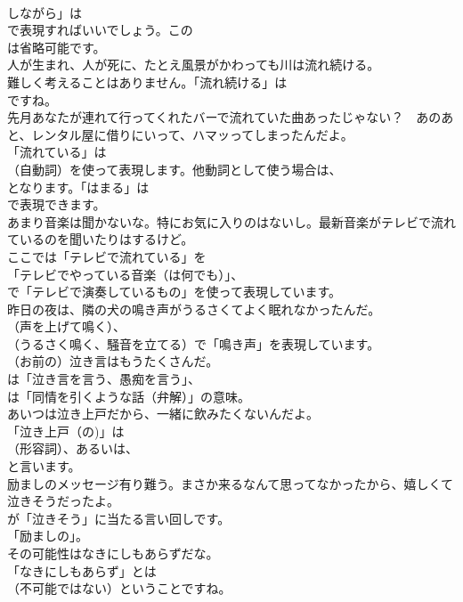 \documentclass[8pt]{extreport}
\begin{document}
\begin{CJK}{UTF8}{min}
\\	しながら」は
\\	で表現すればいいでしょう。この
\\	は省略可能です。	
\\	人が生まれ、人が死に、たとえ風景がかわっても川は流れ続ける。 
\\	難しく考えることはありません。「流れ続ける」は
\\	ですね。	
\\	先月あなたが連れて行ってくれたバーで流れていた曲あったじゃない？　あのあと、レンタル屋に借りにいって、ハマッってしまったんだよ。 
\\	「流れている」は
\\	（自動詞）を使って表現します。他動詞として使う場合は、
\\	となります。「はまる」は 
\\	で表現できます。	
\\	あまり音楽は聞かないな。特にお気に入りのはないし。最新音楽がテレビで流れているのを聞いたりはするけど。 
\\	ここでは「テレビで流れている」を
\\	「テレビでやっている音楽（は何でも）」、
\\	で「テレビで演奏しているもの」を使って表現しています。	
\\	昨日の夜は、隣の犬の鳴き声がうるさくてよく眠れなかったんだ。 
\\	（声を上げて鳴く）、
\\	（うるさく鳴く、騒音を立てる）で「鳴き声」を表現しています。	
\\	（お前の）泣き言はもうたくさんだ。 
\\	は「泣き言を言う、愚痴を言う」、
\\	は「同情を引くような話（弁解）」の意味。	
\\	あいつは泣き上戸だから、一緒に飲みたくないんだよ。 
\\	「泣き上戸（の)」は
\\	（形容詞）、あるいは、
\\	と言います。	
\\	励ましのメッセージ有り難う。まさか来るなんて思ってなかったから、嬉しくて泣きそうだったよ。 
\\	が「泣きそう」に当たる言い回しです。
\\	「励ましの」。	
\\	その可能性はなきにしもあらずだな。 
\\	「なきにしもあらず」とは
\\	（不可能ではない）ということですね。	

\end{CJK}
\end{document}
